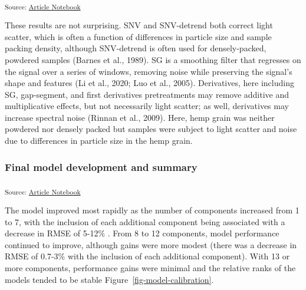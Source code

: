 \documentclass[
]{agujournal2019}
\begin{document}
\textsubscript{Source:
\href{https://rvcrawford.github.io/glowing-system/index.qmd.html}{Article
Notebook}}

These results are not surprising. SNV and SNV-detrend both correct light
scatter, which is often a function of differences in particle size and
sample packing density, although SNV-detrend is often used for
densely-packed, powdered samples (Barnes et al., 1989). SG is a
smoothing filter that regresses on the signal over a series of windows,
removing noise while preserving the signal's shape and features (Li et
al., 2020; Luo et al., 2005). Derivatives, here including SG,
gap-segment, and first derivatives pretreatments may remove additive and
multiplicative effects, but not necessarily light scatter; as well,
derivatives may increase spectral noise (Rinnan et al., 2009). Here,
hemp grain was neither powdered nor densely packed but samples were
subject to light scatter and noise due to differences in particle size
in the hemp grain.

\subsubsection{Final model development and
summary}\label{final-model-development-and-summary}

\textsubscript{Source:
\href{https://rvcrawford.github.io/glowing-system/index.qmd.html}{Article
Notebook}}

The model improved most rapidly as the number of components increased
from 1 to 7, with the inclusion of each additional component being
associated with a decrease in RMSE of 5-12\% . From 8 to 12 components,
model performance continued to improve, although gains were more modest
(there was a decrease in RMSE of 0.7-3\% with the inclusion of each
additional component). With 13 or more components, performance gains
were minimal and the relative ranks of the models tended to be stable
Figure~\ref{fig-model-calibration}.
\end{document}
